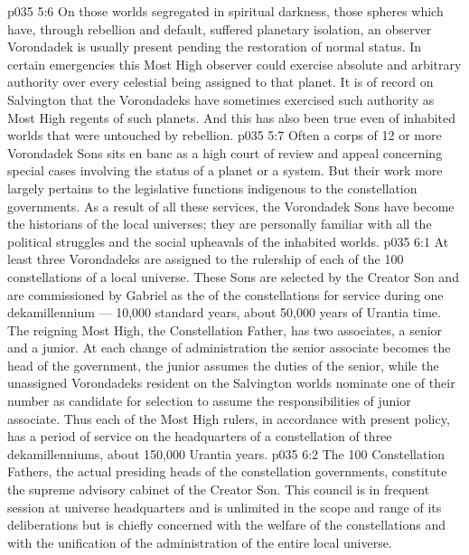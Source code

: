 \vs p035 5:6 On those worlds segregated in spiritual darkness, those spheres which have, through rebellion and default, suffered planetary isolation, an observer Vorondadek is usually present pending the restoration of normal status. In certain emergencies this Most High observer could exercise absolute and arbitrary authority over every celestial being assigned to that planet. It is of record on Salvington that the Vorondadeks have sometimes exercised such authority as Most High regents of such planets. And this has also been true even of inhabited worlds that were untouched by rebellion.
\vs p035 5:7 Often a corps of 12 or more Vorondadek Sons sits en banc as a high court of review and appeal concerning special cases involving the status of a planet or a system. But their work more largely pertains to the legislative functions indigenous to the constellation governments. As a result of all these services, the Vorondadek Sons have become the historians of the local universes; they are personally familiar with all the political struggles and the social upheavals of the inhabited worlds.
\vs p035 6:1 At least three Vorondadeks are assigned to the rulership of each of the 100 constellations of a local universe. These Sons are selected by the Creator Son and are commissioned by Gabriel as the  of the constellations for service during one dekamillennium --- 10,000 standard years, about 50,000 years of Urantia time. The reigning Most High, the Constellation Father, has two associates, a senior and a junior. At each change of administration the senior associate becomes the head of the government, the junior assumes the duties of the senior, while the unassigned Vorondadeks resident on the Salvington worlds nominate one of their number as candidate for selection to assume the responsibilities of junior associate. Thus each of the Most High rulers, in accordance with present policy, has a period of service on the headquarters of a constellation of three dekamillenniums, about 150,000 Urantia years.
\vs p035 6:2 The 100 Constellation Fathers, the actual presiding heads of the constellation governments, constitute the supreme advisory cabinet of the Creator Son. This council is in frequent session at universe headquarters and is unlimited in the scope and range of its deliberations but is chiefly concerned with the welfare of the constellations and with the unification of the administration of the entire local universe.
